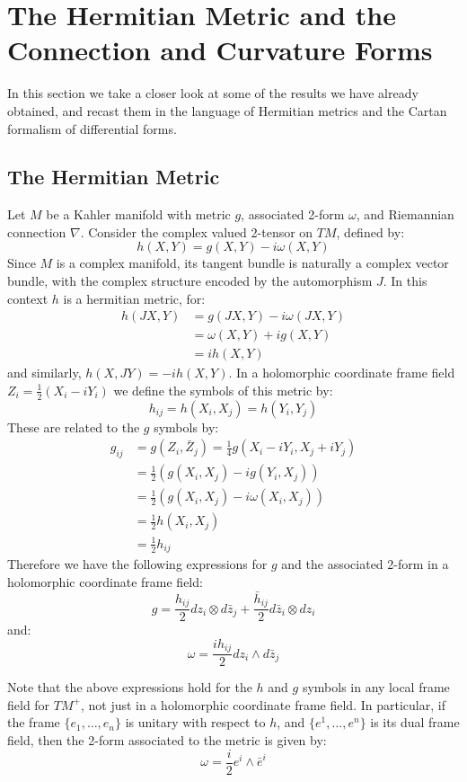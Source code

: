 \section{The Hermitian Metric and the Connection and Curvature Forms}

In this section we take a closer look at some of the results we have already obtained, and recast them in the language of Hermitian metrics and the Cartan formalism of differential forms.

\subsection{The Hermitian Metric}

Let $M$ be a Kahler manifold with metric $g$, associated 2-form $\omega$, and Riemannian connection $\nabla$.  Consider the complex valued 2-tensor on $TM$, defined by:
%
$$ h(X,Y) = g(X,Y) - i \omega(X,Y) $$
%
Since $M$ is a complex manifold, its tangent bundle is naturally a complex vector bundle, with the complex structure encoded by the automorphism $J$.  In this context $h$ is a hermitian metric, for:
%
\begin{align*}
h(JX,Y) &= g(JX,Y) - i \omega( JX, Y ) \\
&= \omega( X, Y ) + i g( X, Y ) \\
&= i h(X,Y)
\end{align*}
%
and similarly, $ h(X,JY) = - ih(X,Y) $.  In a holomorphic coordinate frame field $Z_i = \frac{1}{2}(X_i - i Y_i)$ we define the symbols of this metric by:
%
$$h_{ij} = h( X_i, X_j ) = h( Y_i, Y_j )$$
%
These are related to the $g$ symbols by:
%
\begin{align*}
g_{ij} &= g( Z_i, \bar{Z}_j ) = \frac{1}{4}g( X_i - i Y_i, X_j + i Y_j ) \\
&= \frac{1}{2}( g(X_i, X_j) - i g( Y_i, X_j ) ) \\
&= \frac{1}{2}( g(X_i, X_j) - i \omega( X_i, X_j ) ) \\
&= \frac{1}{2} h( X_i, X_j ) \\
&= \frac{1}{2} h_{ij}
\end{align*}
%
Therefore we have the following expressions for $g$ and the associated 2-form in a holomorphic coordinate frame field:
%
$$ g = \frac{ h_{ij} }{2}  d z_i \otimes d \bar{z}_j + \frac{ \bar{h}_{ij} }{2} d \bar{z}_i \otimes d z_i  $$
%
and:
%
$$ \omega = \frac{i h_{ij} }{2} d z_i \wedge d \bar{z}_j $$

\begin{remark}  Note that the above expressions hold for the $h$ and $g$ symbols in any local frame field for $TM^{+}$, not just in a holomorphic coordinate frame field.  In particular, if the frame $\{ e_1, \ldots, e_n \}$ is unitary with respect to $h$, and $ \{ e^1, \ldots, e^n \} $ is its dual frame field, then the 2-form associated to the metric is given by:
%
$$ \omega = \frac{i}{2} e^i \wedge \bar{e}^i $$
%
\end{remark}

